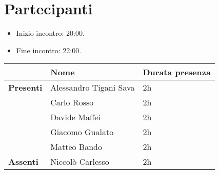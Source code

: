 \section{Partecipanti}

\begin{itemize}
	\item Inizio incontro: 20:00.
	\item Fine incontro: 22:00.
\end{itemize}


\begin{center}
	{\renewcommand{\arraystretch}{1.5}
		\begin{tabular}{lll}
			                  & \textbf{Nome}          & \textbf{Durata presenza} \\
			\hline
			\textbf{Presenti} & Alessandro Tigani Sava & 2h                       \\
			                  & Carlo Rosso            & 2h                       \\
			                  & Davide Maffei          & 2h                       \\
			                  & Giacomo Gualato        & 2h                       \\
			                  & Matteo Bando           & 2h                       \\
			\textbf{Assenti}  & Niccolò Carlesso       & 2h                       \\
			\hline
		\end{tabular}
	}
\end{center}
